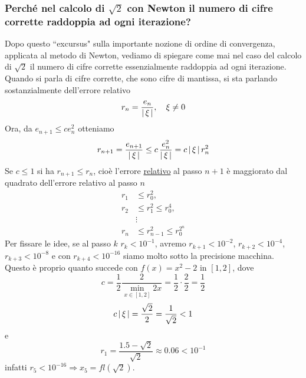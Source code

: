 \documentclass[12pt]{article}
\DeclarePairedDelimiter{\abs}{\lvert}{\rvert}
\begin{document}
\subsubsection{Perché nel calcolo di $\sqrt2$ con Newton il numero di cifre corrette raddoppia ad ogni iterazione?}
Dopo questo ``excursus" sulla importante nozione di ordine di convergenza, applicata al metodo di Newton, vediamo di spiegare come mai nel caso del calcolo di $\sqrt{2}$ il numero di cifre corrette essenzialmente raddoppia ad ogni iterazione.\\
Quando si parla di cifre corrette, che sono cifre di mantissa, si sta parlando sostanzialmente dell'errore relativo 
\[r_n = \frac{e_n}{\abs{\,\xi\,}}, \quad \xi \neq 0\]
Ora, da $e_{n+1} \leq ce_n^2$ otteniamo 
\[ r_{n+1} = \frac{e_{n+1}}{\abs{\,\xi\,}} \leq c\,\frac{e_n^2}{\abs{\,\xi\,}} = c\,\abs{\,\xi\,}\,r_n^2 \]
Se $c \leq 1$ si ha $r_{n+1} \leq r_n$, cioè l'errore \uline{relativo} al passo $n+1$ è maggiorato dal quadrato dell'errore relativo al passo $n$
\[\begin{split}
    r_1 & \leq r_0^2,\\
    r_2 & \leq r_1^2 \leq r_0^4,\\ 
    & \vdots \\ 
    r_n & \leq r_{n-1}^2 \leq r_0^{2^n}
\end{split}\]
Per fissare le idee, se al passo $k$ $r_k < 10^{-1}$, avremo $r_{k+1} < 10^{-2}$, $r_{k+2} < 10^{-4}$, $r_{k+3} < 10^{-8}$ e con $r_{k+4} < 10^{-16}$ siamo molto sotto la precisione macchina. \\
Questo è proprio quanto succede con $f(x) = x^2 - 2$ in $[1,2]$, dove 
\[ c = \frac{1}{2}\frac{2}{\underset{x \in [1,2]}{\min}2x}  = \frac{1}{2} \cdot \frac{2}{2} = \frac{1}{2} \]
\[c\,\abs{\,\xi\,} = \frac{\sqrt{2}}{2} = \frac{1}{\sqrt{2}} < 1\]
e
\[ r_1 = \frac{1.5 - \sqrt{2}}{\sqrt{2}} \approx 0.06 < 10^{-1} \]
infatti $r_5 < 10^{-16} \Rightarrow x_5 = fl(\sqrt{2})$.
\end{document}
